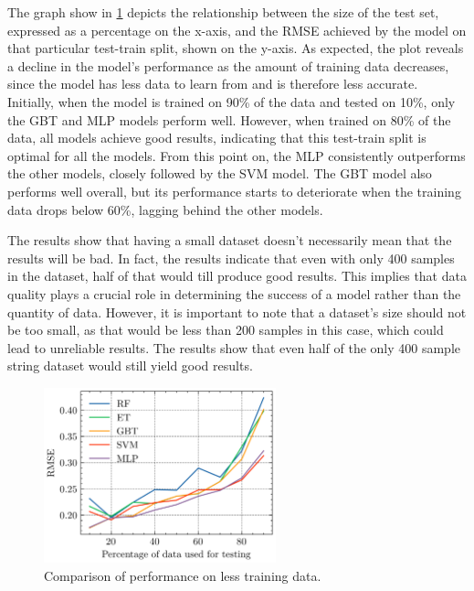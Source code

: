 The graph show in \cref{fig:results-missing-values} depicts the relationship between the size of the test set,
expressed as a
percentage
on the
x-axis, and
the RMSE achieved by the model on that particular test-train split, shown on the y-axis.
As expected, the plot reveals a decline in the model's performance as the amount of training data decreases, since the
model has less data to learn from and is therefore less accurate.
Initially, when the model is trained on 90\% of the data and tested on 10\%, only the GBT and MLP models perform well.
However, when trained on 80\% of the data, all models achieve good results, indicating that this test-train split is
optimal for all the models.
From this point on, the MLP consistently outperforms the other models, closely followed by the SVM model. The GBT
model also performs well overall, but its performance starts to deteriorate when the training data drops below 60\%,
lagging behind the other models.

The results show that having a small dataset doesn't necessarily mean that the results will be bad.
In fact, the results indicate that even with only 400 samples in the dataset, half of that would till produce good
results.
This implies that data quality plays a crucial role in determining the success of a model rather than the quantity of
data.
However, it is important to note that a dataset's size should not be too small, as that would be less than 200
samples in this case, which could lead to unreliable results.
The results show that even half of the only 400 sample string dataset would still yield good results.

\begin{figure}[h]
    \begin{tcolorbox}[arc=0pt,boxrule=0.5pt]
        \centering
        \includegraphics[width=0.6\textwidth]{chap5/images/missing_values_plot}
    \end{tcolorbox}
    \caption{Comparison of performance on less training data.}
    \label{fig:results-missing-values}
\end{figure}

